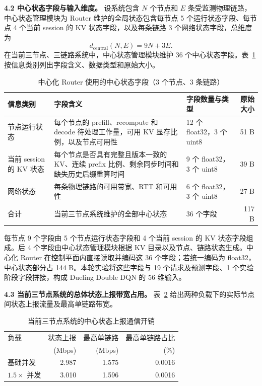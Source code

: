 \textbf{4.2 中心状态字段与输入维度。}
设系统包含 \(N\) 个节点和 \(E\) 条受监测物理链路，中心状态管理模块为 Router 维护的全局状态包含每节点 5 个运行状态字段、每节点 4 个当前 session 的 KV 状态字段，以及每条链路 3 个网络状态字段，总维度为
\[
d_{\mathrm{central}}(N,E)=9N+3E.
\]
在当前三节点、三链路系统中，中心状态管理模块维护 36 个中心状态字段。表~\ref{tab:central-agent-metadata} 按信息类别列出字段含义、数据类型和原始大小。

\begin{table}[H]
\centering
\footnotesize
\caption{中心化 Router 使用的中心状态字段（3 个节点、3 条链路）}
\label{tab:central-agent-metadata}
\begin{tabular}{@{}p{}p{}p{}r@{}}
\toprule
信息类别 & 字段含义 & 字段数量与类型 & 原始大小 \\
\midrule
节点运行状态
& 每个节点的 prefill、recompute 和 decode 待处理工作量，可用 KV 显存比例，以及节点可用性
& 12 个 float32，3 个 uint8
& 51 B \\
当前 session 的 KV 状态
& 每个节点是否具有完整且版本一致的 KV、连续 prefix 比例、剩余同步时间和缺失历史后缀重算时间
& 9 个 float32，3 个 uint8
& 39 B \\
网络状态
& 每条物理链路的可用带宽、RTT 和可用性
& 6 个 float32，3 个 uint8
& 27 B \\
\midrule
合计
& 当前三节点系统维护的全部中心状态
& 36 个字段
& 117 B \\
\bottomrule
\end{tabular}
\end{table}

每节点 9 个字段由 5 个节点运行状态字段和 4 个当前 session 的 KV 状态字段组成。后 4 个字段由中心状态管理模块根据 KV 目录以及节点、链路状态生成。中心化 Router 在控制平面内直接读取并编码这 36 个字段；若统一编码为 float32，中心状态部分占 144 B。本轮实验将这些字段与 19 个请求及预测字段、1 个实验阶段字段拼接，构成 Dueling Double DQN 的 56 维输入。

\textbf{4.3 当前三节点系统的总体状态上报带宽占用。}
表~\ref{tab:control-plane-overhead} 给出两种负载下的实际节点间状态上报流量及最高单链路带宽。

\begin{table}[H]
\centering
\small
\caption{当前三节点系统的中心状态上报通信开销}
\label{tab:control-plane-overhead}
\begin{tabular}{@{}lrrr@{}}
\toprule
负载
& 状态上报
& 最高单链路
& 最高单链路占比 \\
& (Mbps) & (Mbps) & (\%) \\
\midrule
基础并发
& 2.987 & 1.575 & 0.0016 \\
\(1.5\times\) 并发
& 3.010 & 1.596 & 0.0016 \\
\bottomrule
\end{tabular}
\end{table}

